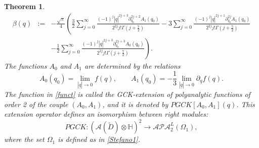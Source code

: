 \documentclass[reqno,11pt]{amsart}
\numberwithin{equation}{section}
\newtheorem{theorem}{Theorem}[section]
\theoremstyle{definition}
\begin{document}
\begin{theorem}
\begin{eqnarray}
	\nonumber
	\beta(q)&:=& -  \frac{\sqrt{\pi}}{4}\left( \frac{3}{2} \sum_{j=0}^\infty \frac{(-1)^j |\underline{q}|^{2 j+3} \partial_{q_0}^{2 j+2}A_1(q_0)}{2^{2j}j! \Gamma \left(j+\frac{7}{2}\right)}- 3 \sum_{j=0}^\infty \frac{(-1)^j |\underline{q}|^{2j+1} \partial_{q_0}^{2j}A_1(q_0)}{2^{2j}j! \Gamma \left(j+\frac{5}{2}\right)} \right.\\
	\label{imm}
	&&\left. - \frac{1}{2} \sum_{j=0}^\infty \frac{(-1)^j |\underline{q}|^{2j+3} \partial_{q_0}^{2j+3} A_0(q_0)}{2^{2j} j! \Gamma \left(j+\frac{7}{2}\right)} \right).
\end{eqnarray}
The functions $A_0$ and $A_1$ are determined by the relations
\begin{equation}
\label{infun}
A_0(q_0)= \lim_{|\underline{q}| \to 0}f(q), \qquad
A_1(q_0)= -\frac{1}{3} \lim_{|\underline{q}| \to 0}\partial_{\underline{q}} f(q).
\end{equation}
The function in \eqref{funct} is called the GCK-extension of polyanalytic functions of order 2 of the couple $(A_0, A_1)$, and it is denoted by $PGCK[A_0,A_1](q)$. This extension operator defines an isomorphism between right modules:
$$ PGCK: (\mathcal{A}(\tilde{D}) \otimes \mathbb{H})^2 \to \mathcal{APA}_2^L(\Omega_1),$$
where the set $\Omega_1$ is defined as in \eqref{Stefano1}.
\end{theorem}	
\end{document}
